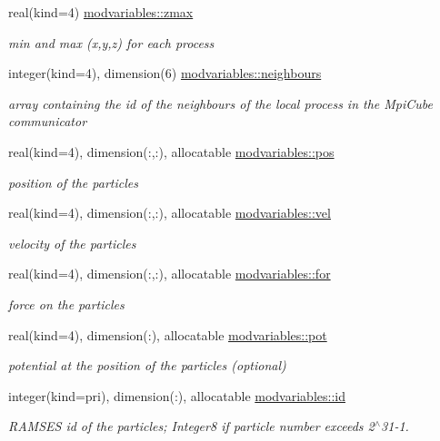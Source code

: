 \begin{DoxyCompactItemize}
real(kind=4) \hyperlink{namespacemodvariables_ab9a39f4e4f686b80011f46a2f88617c1}{modvariables\+::zmax}
\begin{DoxyCompactList}\small\item\em min and max (x,y,z) for each process \end{DoxyCompactList}\item 
integer(kind=4), dimension(6) \hyperlink{namespacemodvariables_ad84b74b636d64be51d7aba857b4b5c05}{modvariables\+::neighbours}
\begin{DoxyCompactList}\small\item\em array containing the id of the neighbours of the local process in the Mpi\+Cube communicator \end{DoxyCompactList}\item 
real(kind=4), dimension(\+:,\+:), allocatable \hyperlink{namespacemodvariables_a2f72d5750b0cf2e9bfa6e139d09c6862}{modvariables\+::pos}
\begin{DoxyCompactList}\small\item\em position of the particles \end{DoxyCompactList}\item 
real(kind=4), dimension(\+:,\+:), allocatable \hyperlink{namespacemodvariables_a9f11e44143a4c5cd47740e58712bbe1c}{modvariables\+::vel}
\begin{DoxyCompactList}\small\item\em velocity of the particles \end{DoxyCompactList}\item 
real(kind=4), dimension(\+:,\+:), allocatable \hyperlink{namespacemodvariables_a81417dbf044e4c170e3b3ae6eebcd6a1}{modvariables\+::for}
\begin{DoxyCompactList}\small\item\em force on the particles \end{DoxyCompactList}\item 
real(kind=4), dimension(\+:), allocatable \hyperlink{namespacemodvariables_a872451e872cc528b38bd43f2ed09b446}{modvariables\+::pot}
\begin{DoxyCompactList}\small\item\em potential at the position of the particles (optional) \end{DoxyCompactList}\item 
integer(kind=pri), dimension(\+:), allocatable \hyperlink{namespacemodvariables_ac2069a0665c46610db9e57a5d5eaf195}{modvariables\+::id}
\begin{DoxyCompactList}\small\item\em R\+A\+M\+S\+ES id of the particles; Integer8 if particle number exceeds 2$^\wedge$31-\/1. \end{DoxyCompactList}\item 

\end{DoxyCompactItemize}
